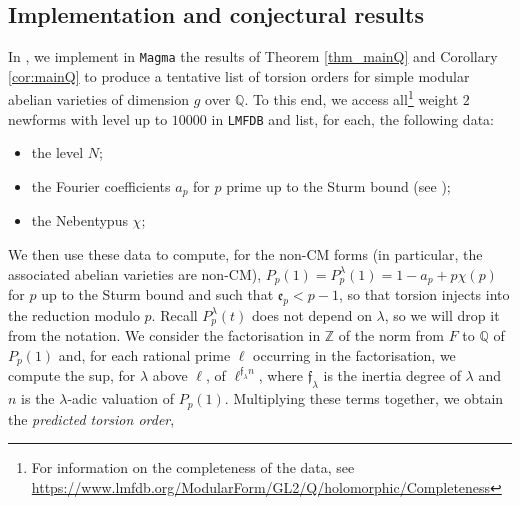 \documentclass[a4paper,11pt]{amsart}
\theoremstyle{definition}
\newcommand{\Q}{\mathbb Q}
\newcommand{\Z}{\mathbb Z}
\newcommand{\f}{\mathfrak{f}}
\newcommand{\e}{\mathfrak{e}}
\DeclareMathOperator{\Frob}{Frob}
\begin{document}
\subsection{Implementation and conjectural results}
In \cite{Alessandri2026MagmaVarieties}, we implement in \texttt{Magma} the results of Theorem \ref{thm_mainQ} and Corollary \ref{cor:mainQ} to produce a tentative list of torsion orders for simple modular abelian varieties of dimension \(g\) over \(\Q\). To this end, we access all\footnote{For information on the completeness of the data, see \url{https://www.lmfdb.org/ModularForm/GL2/Q/holomorphic/Completeness}} weight \(2\) newforms with level up to \(10000\) in \texttt{LMFDB} and list, for each, the following data:
\begin{itemize}
    \item the level \(N\);
    \item the Fourier coefficients \(a_p\) for \(p\) prime up to the Sturm bound (see \cite[Corollary 9.20]{Stein2007});
    \item the Nebentypus \(\chi\);
\end{itemize}
We then use these data to compute, for the non-CM forms (in particular, the associated abelian varieties are non-CM), \(P_p(1)=P_p^\lambda(1) = 1 - a_p + p\chi(p)\) for \(p\) up to the Sturm bound and such that \(\e_p < p-1\), so that torsion injects into the reduction modulo \(p\). Recall \(P_p^\lambda(t)\) does not depend on \(\lambda\), so we will drop it from the notation. We consider the factorisation in \(\Z\) of the norm from \(F\) to \(\Q\) of \(P_p(1)\) and, for each rational prime \(\ell\) occurring in the factorisation, we compute the sup, for \(\lambda\) above \(\ell\), of \(\ell^{\f_\lambda n}\), where \(\f_\lambda\) is the inertia degree of \(\lambda\) and \(n\) is the \(\lambda\)-adic valuation of \(P_p(1)\). Multiplying these terms together, we obtain the \emph{predicted torsion order},
\end{document}
